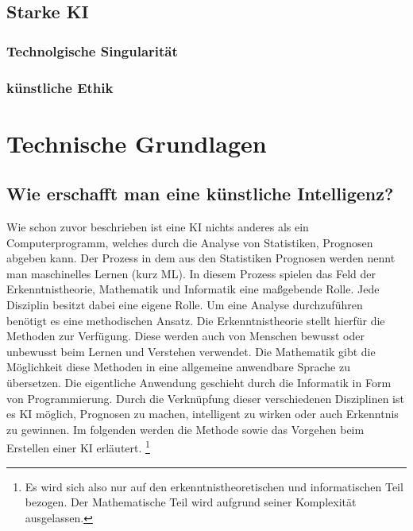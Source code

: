 \documentclass[12pt,german,ngerman]{report}
\begin{document}
        \subsection{}
    \section{Starke KI}
        \subsection{Technolgische Singularität}
        \subsection{künstliche Ethik}

\chapter{Technische Grundlagen}
    \section{Wie erschafft man eine künstliche Intelligenz?}
        Wie schon zuvor beschrieben ist eine KI nichts anderes als ein Computerprogramm,
        welches durch die Analyse von Statistiken, Prognosen abgeben kann.
        Der Prozess in dem aus den Statistiken Prognosen werden nennt man maschinelles Lernen (kurz ML).
        In diesem Prozess spielen das Feld der Erkenntnistheorie, Mathematik und Informatik 
        eine maßgebende Rolle. Jede Disziplin besitzt dabei eine eigene Rolle. 
        Um eine Analyse durchzuführen benötigt es eine methodischen Ansatz.
        Die Erkenntnistheorie stellt hierfür die Methoden zur Verfügung. Diese werden auch von 
        Menschen bewusst oder unbewusst beim Lernen und Verstehen verwendet. Die Mathematik
        gibt die Möglichkeit diese Methoden in eine allgemeine anwendbare Sprache zu übersetzen.
        Die eigentliche Anwendung geschieht durch die Informatik in Form von Programmierung.
        Durch die Verknüpfung dieser verschiedenen Disziplinen ist es KI möglich,
        Prognosen zu machen, intelligent zu wirken oder auch Erkenntnis zu gewinnen.
        Im folgenden werden die Methode sowie das Vorgehen beim Erstellen einer KI erläutert.
        \footnote{Es wird sich also nur auf den erkenntnistheoretischen und informatischen Teil bezogen. 
        Der Mathematische Teil wird aufgrund seiner Komplexität ausgelassen.}
\end{document}
